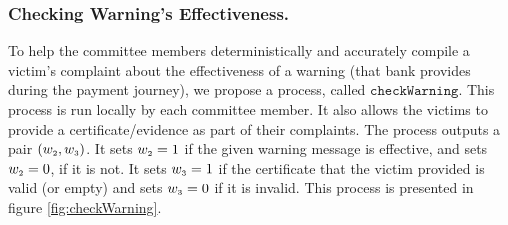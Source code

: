 


\subsubsection{Checking Warning's Effectiveness.}



To help the committee members deterministically and accurately compile a victim's  complaint about the effectiveness of a warning (that bank provides during the payment journey), we propose a process,  called $\mathtt{checkWarning}$.  This process is run locally by each committee member. It also allows the victims to provide a certificate/evidence as part of their complaints.   The process outputs a pair $(w_{\scriptscriptstyle 2}, w_{\scriptscriptstyle 3})$. It  sets $w_{\scriptscriptstyle 2}=1$  if the given warning message is effective, and sets $w_{\scriptscriptstyle 2}=0$, if it is not. It sets $w_{\scriptscriptstyle 3}=1$ if the certificate that the victim provided is valid (or empty) and sets $w_{\scriptscriptstyle 3}=0$ if it is invalid.  This process is presented in figure \ref{fig:checkWarning}.


